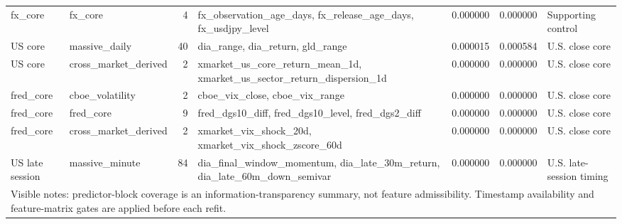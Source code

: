 \begin{tabular}{llrllll}
fx\_core & fx\_core & 4 & fx\_observation\_age\_days, fx\_release\_age\_days, fx\_usdjpy\_level & 0.000000 & 0.000000 & Supporting control \\
US core & massive\_daily & 40 & dia\_range, dia\_return, gld\_range & 0.000015 & 0.000584 & U.S. close core \\
US core & cross\_market\_derived & 2 & xmarket\_us\_core\_return\_mean\_1d, xmarket\_us\_sector\_return\_dispersion\_1d & 0.000000 & 0.000000 & U.S. close core \\
fred\_core & cboe\_volatility & 2 & cboe\_vix\_close, cboe\_vix\_range & 0.000000 & 0.000000 & U.S. close core \\
fred\_core & fred\_core & 9 & fred\_dgs10\_diff, fred\_dgs10\_level, fred\_dgs2\_diff & 0.000000 & 0.000000 & U.S. close core \\
fred\_core & cross\_market\_derived & 2 & xmarket\_vix\_shock\_20d, xmarket\_vix\_shock\_zscore\_60d & 0.000000 & 0.000000 & U.S. close core \\
US late session & massive\_minute & 84 & dia\_final\_window\_momentum, dia\_late\_30m\_return, dia\_late\_60m\_down\_semivar & 0.000000 & 0.000000 & U.S. late-session timing \\
\midrule
\multicolumn{7}{l}{\footnotesize Visible notes: predictor-block coverage is an information-transparency summary, not feature admissibility. Timestamp availability and feature-matrix gates are applied before each refit.} \\
\bottomrule
\end{tabular}
